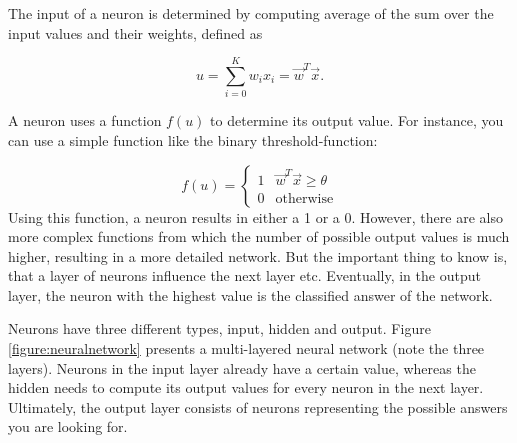 \documentclass[a4paper,11pt]{article}
\begin{document}
The input of a neuron is determined by computing average of the sum over the input values and their weights, defined as

\begin{equation}
u = \sum_{i=0}^{K}w_i x_i = \vec{w}^T \vec{x}.
\end{equation}

A neuron uses a function $f(u)$ to determine its output value. For instance, you can use a simple function like the binary threshold-function:

\begin{equation}
f(u) = \begin{cases}
1 & \vec{w}^T \vec{x} \geq \theta \\
0 & \text{otherwise}
\end{cases}
\end{equation}
Using this function, a neuron results in either a 1 or a 0. However, there are also more complex functions from which the number of possible output values is much higher, resulting in a more detailed network. But the important thing to know is, that a layer of neurons influence the next layer etc. Eventually, in the output layer, the neuron with the highest value is the classified answer of the network.

Neurons have three different types, input, hidden and output. Figure \ref{figure:neuralnetwork} presents a multi-layered neural network (note the three layers). Neurons in the input layer already have a certain value, whereas the hidden needs to compute its output values for every neuron in the next layer. Ultimately, the output layer consists of neurons representing the possible answers you are looking for. 
\end{document}
